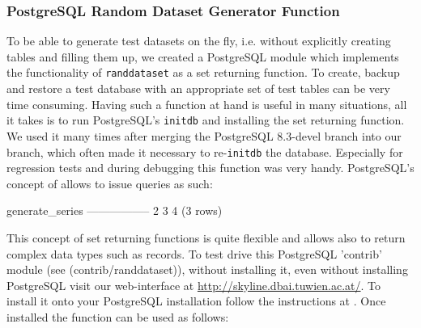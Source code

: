 \subsubsection{PostgreSQL Random Dataset Generator Function}
\label{sec:set-returning-function}

To be able to generate test datasets on the fly, i.e. without
explicitly creating tables and filling them up, we created a PostgreSQL
module which implements the functionality of \texttt{randdataset} as a
set returning function. To create, backup and restore a test database
with an appropriate set of test tables can be very time
consuming. Having such a function at hand is useful in many situations,
all it takes is to run PostgreSQL's \texttt{initdb} and installing the set
returning function. We used it many times after merging the PostgreSQL
8.3-devel branch into our branch, which often made it necessary to
re-\texttt{initdb} the database. Especially for regression tests and during
debugging this function was very handy. PostgreSQL's concept of
 allows to
issue queries as such:

\begin{interactive}
 generate_series
-----------------
               2
               3
               4
(3 rows)
\end{interactive}

This concept of set returning functions is quite flexible and allows
also to return complex data types such as records. To test drive this
PostgreSQL 'contrib' module (see
\srcref(contrib/randdataset)), without installing it, even without
installing PostgreSQL visit our web-interface at
\url{http://skyline.dbai.tuwien.ac.at/}. To install it onto your
PostgreSQL installation follow the instructions at
. Once installed the
function can be used as follows:

